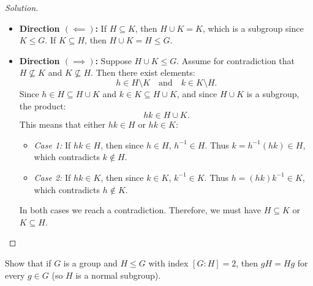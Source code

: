\begin{proof}[Solution]
\begin{itemize}[leftmargin=1.5em, itemsep=6pt]
    \item \textbf{Direction $(\impliedby)$:} If $H \subseteq K$, then $H \cup K = K$, which is a subgroup since $K \le G$.
    If $K \subseteq H$, then $H \cup K = H \le G$.
    
    \item \textbf{Direction $(\implies)$:} Suppose $H \cup K \le G$.
    Assume for contradiction that $H \not\subseteq K$ and $K \not\subseteq H$.
    Then there exist elements:
    \begin{equation*}
    h \in H \setminus K \quad \text{and} \quad k \in K \setminus H.
    \end{equation*}
    Since $h \in H \subseteq H \cup K$ and $k \in K \subseteq H \cup K$, and since $H \cup K$ is a subgroup, the product:
    \begin{equation*}
    hk \in H \cup K.
    \end{equation*}
    This means that either $hk \in H$ or $hk \in K$:
    \begin{itemize}[leftmargin=1.5em, itemsep=3pt]
        \item \emph{Case 1:} If $hk \in H$, then since $h \in H$, $h^{-1} \in H$.
        Thus $k = h^{-1}(hk) \in H$, which contradicts $k \notin H$.
        \item \emph{Case 2:} If $hk \in K$, then since $k \in K$, $k^{-1} \in K$.
        Thus $h = (hk)k^{-1} \in K$, which contradicts $h \notin K$.
    \end{itemize}
    In both cases we reach a contradiction. Therefore, we must have $H \subseteq K$ or $K \subseteq H$.
\end{itemize}
\end{proof}

\begin{problem}
Show that if $G$ is a group and $H \le G$ with index $[G : H] = 2$, then $gH = Hg$ for every $g \in G$ (so $H$ is a normal subgroup).
\end{problem}


